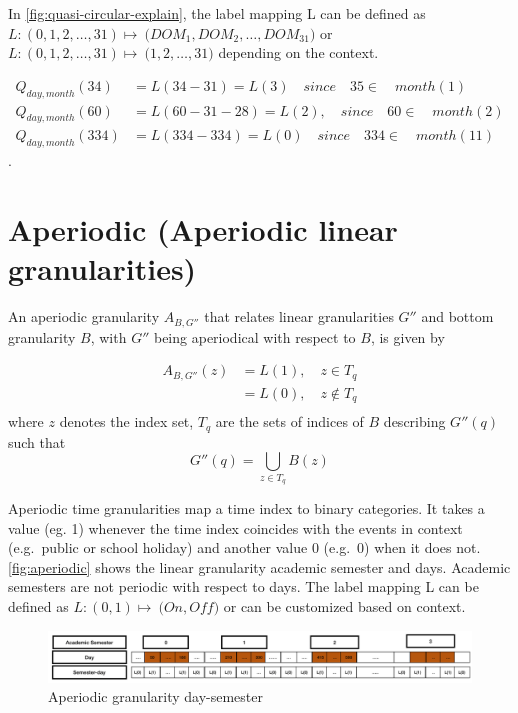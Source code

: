 \documentclass[10pt,a4paper,]{article}
\begin{document}
In \autoref{fig:quasi-circular-explain}, the label mapping L can be defined as \(L: ({0,1,2, \dots, 31}) \longmapsto\ ({DOM_1, DOM_2, \dots, DOM_{31})}\) or \(L: ({0,1,2, \dots, 31}) \longmapsto\ ({1, 2, \dots, 31)}\)
depending on the context.

\begin{equation}
\begin{split}
Q_{day, month}(34) & = L(34 - 31)       = L(3) \quad since \quad 35 \in \quad month(1)\\
Q_{day, month}(60) & = L(60 - 31 - 28)  = L(2) , \quad since\quad 60 \in \quad month(2)\\
Q_{day, month}(334) & = L(334 - 334)    = L(0) \quad since \quad 334 \in \quad month(11)
\end{split}
\end{equation}.

\hypertarget{aperiodic-aperiodic-linear-granularities}{%
\section{Aperiodic (Aperiodic linear granularities)}\label{aperiodic-aperiodic-linear-granularities}}

\begin{definition}\label{aperiodic}
An aperiodic granularity $A_{B, G''}$ that relates linear granularities $G''$ and bottom granularity $B$, with $G''$ being aperiodical with respect to $B$, is given by

\begin{equation}\label{eq:eq7}
\begin{split}
A_{B, G''}(z) & = L(1), \quad z \in T_q\\
     & = L(0), \quad z \not\in T_q\\
\end{split}
\end{equation}
where  
$z$ denotes the index set,
$T_q$ are the sets of indices of $B$ describing $G''(q)$ such that $$G''(q) = \bigcup_{z \in T_q}B(z)$$
\end{definition}

Aperiodic time granularities map a time index to binary categories. It takes a value (eg. 1) whenever the time index coincides with the events in context (e.g.~public or school holiday) and another value 0 (e.g.~0) when it does not. \autoref{fig:aperiodic} shows the linear granularity academic semester and days. Academic semesters are not periodic with respect to days. The label mapping L can be defined as \(L: ({0,1}) \longmapsto\ ({On, Off)}\) or can be customized based on context.

\begin{figure}
\includegraphics[width=1\linewidth]{Figs/academ-semester} \caption{ Aperiodic granularity day-semester}\label{fig:aperiodic}
\end{figure}

\printbibliography
\end{document}
